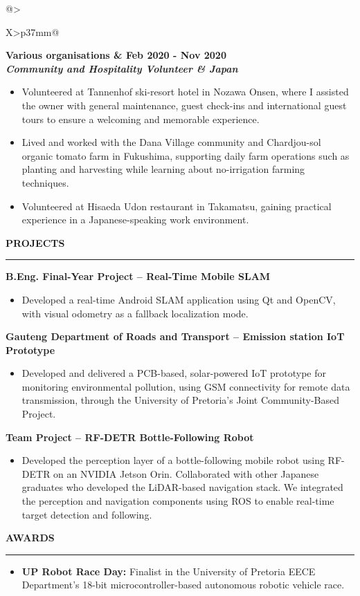 \documentclass[10pt,a4paper]{article}
\makeatletter
\newcommand{\cvsection}[1]{%
  \vspace{0.90em}%
  {\color{cvblue}\bfseries\fontsize{11.2}{11.8}\selectfont #1}\par
    \vspace{-0.5em}%
  {\color{black!58}\rule{\linewidth}{0.35pt}}\par
  \vspace{0.38em}%
}
\newcommand{\job}[4]{%
  \begin{tabularx}{\linewidth}{@{}>{\raggedright\arraybackslash}X>{\raggedleft\arraybackslash}p{37mm}@{}}
    \bfseries #1 & \bfseries #2 \\
    \itshape #3 & \itshape #4
  \end{tabularx}\par
  \vspace{-0.10em}%
}
\newcommand{\project}[1]{%
  \vspace{0.18em}%
  {\bfseries #1}\par
  \vspace{-0.12em}%
}
\makeatother
\begin{document}
\begin{minipage}[t]{0.686\textwidth}
	\job{Various organisations}{Feb 2020 - Nov 2020}{Community and Hospitality Volunteer}{Japan}
	\begin{itemize}
		\item Volunteered at Tannenhof ski-resort hotel in Nozawa Onsen, where I assisted the owner with general maintenance, guest check-ins and international guest tours to ensure a welcoming and memorable experience.
		\item Lived and worked with the Dana Village community and Chardjou-sol organic tomato farm in Fukushima, supporting daily farm operations such as planting and harvesting while learning about no-irrigation farming techniques.
		\item Volunteered at Hisaeda Udon restaurant in Takamatsu, gaining practical experience in a Japanese-speaking work environment.
	\end{itemize}

	\cvsection{PROJECTS}
	\project{B.Eng. Final-Year Project -- Real-Time Mobile SLAM }
	\begin{itemize}
		\item Developed a real-time Android SLAM application using Qt and OpenCV, with visual odometry as a fallback localization mode.
	\end{itemize}

	\project{Gauteng Department of Roads and Transport -- Emission station IoT Prototype }
	\begin{itemize}
		\item Developed and delivered a PCB-based, solar-powered IoT prototype for monitoring environmental pollution, using GSM connectivity for remote data transmission, through the University of Pretoria’s Joint Community-Based Project.
	\end{itemize}

	\project{Team Project -- RF-DETR Bottle-Following Robot}
	\begin{itemize}
		\item Developed the perception layer of a bottle-following mobile robot using RF-DETR on an NVIDIA Jetson Orin. Collaborated with other Japanese graduates who developed the LiDAR-based navigation stack. We integrated the perception and navigation components using ROS to enable real-time target detection and following.
	\end{itemize}

	\cvsection{AWARDS}
	\begin{itemize}
		\item \textbf{UP Robot Race Day:} Finalist in the University of Pretoria EECE Department's 18-bit microcontroller-based autonomous robotic vehicle race.
	\end{itemize}
\end{minipage}%
\end{document}
